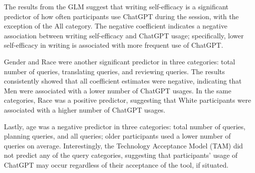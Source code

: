 \documentclass[manuscript,screen,acmsmall]{acmart}
\begin{document}
The results from the GLM suggest that writing self-efficacy is a significant predictor of how often participants use ChatGPT during the session, with the exception of the All category. The negative coefficient indicates a negative association between writing self-efficacy and ChatGPT usage; specifically, lower self-efficacy in writing is associated with more frequent use of ChatGPT.

Gender and Race were another significant predictor in three categories: total number of queries, translating queries, and reviewing queries. The results consistently showed that all coefficient estimates were negative, indicating that Men were associated with a lower number of ChatGPT usages. In the same categories, Race was a positive predictor, suggesting that White participants were associated with a higher number of ChatGPT usages.

Lastly, age was a negative predictor in three categories: total number of queries, planning queries, and all queries; older participants used a lower number of queries on average. Interestingly, the Technology Acceptance Model (TAM) did not predict any of the query categories, suggesting that participants' usage of ChatGPT may occur regardless of their acceptance of the tool, if situated.










\end{document}
